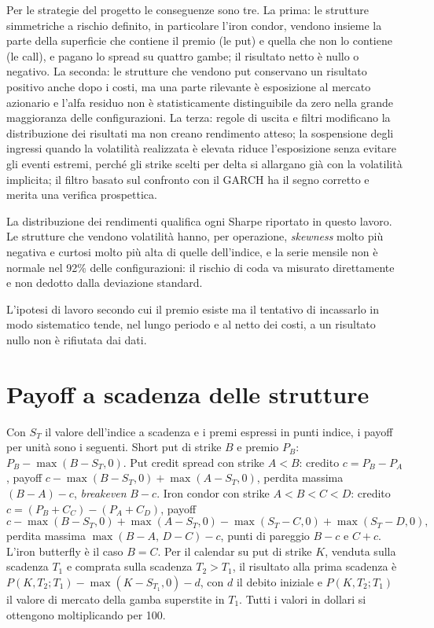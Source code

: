 \documentclass[11pt,a4paper]{article}
\begin{document}
Per le strategie del progetto le conseguenze sono tre. La prima: le strutture simmetriche a rischio definito, in particolare l'iron condor, vendono insieme la parte della superficie che contiene il premio (le put) e quella che non lo contiene (le call), e pagano lo spread su quattro gambe; il risultato netto è nullo o negativo. La seconda: le strutture che vendono put conservano un risultato positivo anche dopo i costi, ma una parte rilevante è esposizione al mercato azionario e l'alfa residuo non è statisticamente distinguibile da zero nella grande maggioranza delle configurazioni. La terza: regole di uscita e filtri modificano la distribuzione dei risultati ma non creano rendimento atteso; la sospensione degli ingressi quando la volatilità realizzata è elevata riduce l'esposizione senza evitare gli eventi estremi, perché gli strike scelti per delta si allargano già con la volatilità implicita; il filtro basato sul confronto con il GARCH ha il segno corretto e merita una verifica prospettica.

La distribuzione dei rendimenti qualifica ogni Sharpe riportato in questo lavoro. Le strutture che vendono volatilità hanno, per operazione, \emph{skewness} molto più negativa e curtosi molto più alta di quelle dell'indice, e la serie mensile non è normale nel 92\% delle configurazioni: il rischio di coda va misurato direttamente e non dedotto dalla deviazione standard.

L'ipotesi di lavoro secondo cui il premio esiste ma il tentativo di incassarlo in modo sistematico tende, nel lungo periodo e al netto dei costi, a un risultato nullo non è rifiutata dai dati.

\appendix
\section{Payoff a scadenza delle strutture}\label{app:payoff}

Con $S_T$ il valore dell'indice a scadenza e i premi espressi in punti indice, i payoff per unità sono i seguenti. Short put di strike $B$ e premio $P_B$: $P_B - \max(B-S_T,0)$. Put credit spread con strike $A<B$: credito $c=P_B-P_A$, payoff $c - \max(B-S_T,0) + \max(A-S_T,0)$, perdita massima $(B-A)-c$, \emph{breakeven} $B-c$. Iron condor con strike $A<B<C<D$: credito $c=(P_B+C_C)-(P_A+C_D)$, payoff
\[
c - \max(B-S_T,0) + \max(A-S_T,0) - \max(S_T-C,0) + \max(S_T-D,0),
\]
perdita massima $\max(B-A,\,D-C)-c$, punti di pareggio $B-c$ e $C+c$. L'iron butterfly è il caso $B=C$. Per il calendar su put di strike $K$, venduta sulla scadenza $T_1$ e comprata sulla scadenza $T_2>T_1$, il risultato alla prima scadenza è $P(K,T_2;T_1) - \max(K-S_{T_1},0) - d$, con $d$ il debito iniziale e $P(K,T_2;T_1)$ il valore di mercato della gamba superstite in $T_1$. Tutti i valori in dollari si ottengono moltiplicando per 100.
\end{document}
